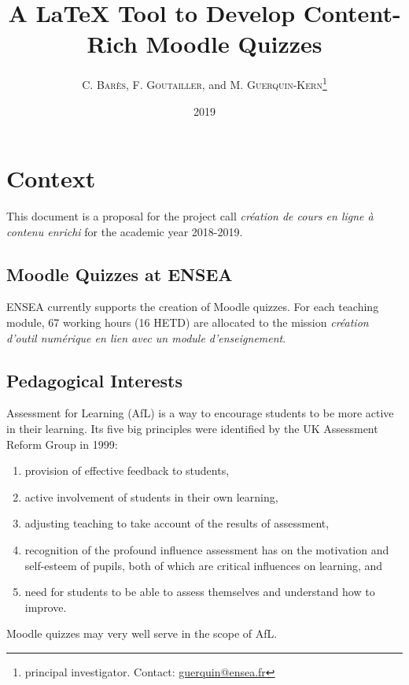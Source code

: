 \documentclass[twocolumn,a4paper,9pt]{article}
\title{A \LaTeX{} Tool to Develop Content-Rich Moodle Quizzes}
\author{C. \textsc{Barès}, F. \textsc{Goutailler}, and M. 
\textsc{Guerquin-Kern}\footnote{principal investigator. Contact: 
\href{mailto:guerquin@ensea.fr}{guerquin@ensea.fr}}}
\date{2019}
\begin{document}
\maketitle
\tableofcontents

\section{Context}

This document is a proposal for the project call \emph{création de cours en 
ligne à contenu enrichi} for the academic year 2018-2019.

\subsection{Moodle Quizzes at ENSEA}

ENSEA currently supports the creation of Moodle quizzes. For each teaching 
module, 67 working hours (16 HETD) are allocated to the mission \emph{création 
d’outil numérique en lien avec un module d’enseignement}.

\subsection{Pedagogical Interests}

Assessment for Learning (AfL) is a way to encourage students to be more active 
in their learning. Its five big principles were identified by the UK Assessment 
Reform Group in 1999:
\begin{enumerate}
	\item provision of effective feedback to students,
	\item active involvement of students in their own learning,
	\item adjusting teaching to take account of the results of assessment,
	\item recognition of the profound influence assessment has on the 
	motivation and self-esteem of pupils, both of which are critical influences 
	on learning, and
	\item need for students to be able to assess themselves and understand how 
	to improve.
\end{enumerate}

Moodle quizzes may very well serve in the scope of AfL.
\end{document}
